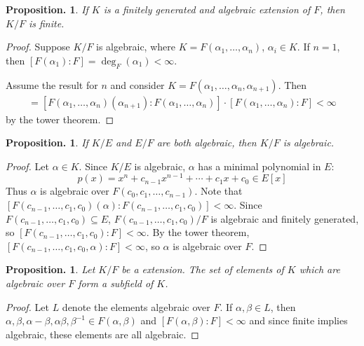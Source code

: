 \documentclass[11pt, a4paper]{memoir}
\theoremstyle{change}
\newtheorem{proposition}[theorem]{Proposition.}
\theoremstyle{plain}
\theoremstyle{nonumberplain}
\newtheorem{proof}{Proof}
\numberwithin{equation}{section}
\begin{document}
\begin{proposition}
    If $K$ is a finitely generated and algebraic extension of $F$, then $K/F$ is finite.
\end{proposition}
\begin{proof}
    Suppose $K/F$ is algebraic, where $K=F(\alpha_1,\ldots,\alpha_n)$, $\alpha_i\in K$.
    If $n=1$, then $[F(\alpha_1):F]=\deg_F(\alpha_1)<\infty$.

    Assume the result for $n$ and consider $K=F(\alpha_1,\ldots,\alpha_n,\alpha_{n+1})$.
    Then
    \begin{align*}
        [F(\alpha_1,\ldots,\alpha_n,\alpha_{n+1})]=[F(\alpha_1,\ldots,\alpha_n)(\alpha_{n+1}):F(\alpha_1,\ldots,\alpha_n)]\cdot[F(\alpha_1,\ldots,\alpha_n):F]<\infty
    \end{align*}
    by the tower theorem.
\end{proof}
\begin{proposition}
    If $K/E$ and $E/F$ are both algebraic, then $K/F$ is algebraic.
\end{proposition}
\begin{proof}
    Let $\alpha\in K$.
    Since $K/E$ is algebraic, $\alpha$ has a minimal polynomial in $E$:
    \begin{equation*}
        p(x)=x^n+c_{n-1}x^{n-1}+\cdots+c_1x+c_0\in E[x]
    \end{equation*}
    Thus $\alpha$ is algebraic over $F(c_0,c_1,\ldots,c_{n-1})$.
    Note that $[F(c_{n-1},\ldots,c_1,c_0)(\alpha):F(c_{n-1},\ldots,c_1,c_0)]<\infty$.
    Since $F(c_{n-1},\ldots,c_1,c_0)\subseteq E$, $F(c_{n-1},\ldots,c_1,c_0)/F$ is algebraic and finitely generated, so $[F(c_{n-1},\ldots,c_1,c_0):F]<\infty$.
    By the tower theorem, $[F(c_{n-1},\ldots,c_1,c_0,\alpha):F]<\infty$, so $\alpha$ is algebraic over $F$.
\end{proof}
\begin{proposition}
    Let $K/F$ be a extension.
    The set of elements of $K$ which are algebraic over $F$ form a subfield of $K$.
\end{proposition}
\begin{proof}
    Let $L$ denote the elements algebraic over $F$.
    If $\alpha,\beta\in L$, then $\alpha,\beta,\alpha-\beta,\alpha\beta,\beta^{-1}\in F(\alpha,\beta)$ and $[F(\alpha,\beta):F]<\infty$ and since finite implies algebraic, these elements are all algebraic.
\end{proof}
\end{document}
